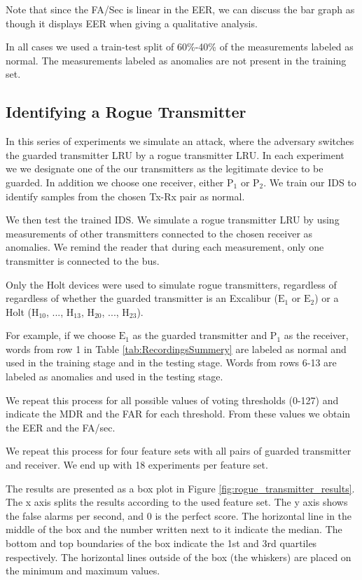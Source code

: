 \documentclass[conference]{IEEEtran}
\begin{document}
  Note that since the FA/Sec is linear in the EER, we can discuss the bar graph as though it displays EER when giving a qualitative analysis.
  
  In all cases we used a train-test split of 60\%-40\% of the measurements labeled as normal. The measurements labeled as anomalies are not present in the training set.
  
\subsection{Identifying a Rogue Transmitter}
  In this series of experiments we simulate an attack, where the adversary switches the guarded transmitter LRU by a rogue transmitter LRU. In each experiment we we designate one of the our transmitters as the legitimate device to be guarded. In addition we choose one receiver, either \(\text{P}_1\) or \(\text{P}_2\).  We train our IDS to identify samples from the chosen Tx-Rx pair as normal.
  
  We then test the trained IDS. We simulate a rogue transmitter LRU by using measurements of other transmitters connected to the chosen receiver as anomalies. We remind the reader that during each measurement, only one transmitter is connected to the bus.
  
  Only the Holt devices were used to simulate rogue transmitters, regardless of regardless of whether the guarded transmitter is an Excalibur (\(\text{E}_1\) or \(\text{E}_2\)) or a Holt (\(\text{H}_{10}\), ..., \(\text{H}_{13}\), \(\text{H}_{20}\), ..., \(\text{H}_{23}\)).
  
  For example, if we choose \(\text{E}_1\) as the guarded transmitter and \(\text{P}_1\) as the receiver, words from row 1 in Table \ref{tab:RecordingsSummery} are labeled as normal and used in the training stage and in the testing stage. Words from rows 6-13 are labeled as anomalies and used in the testing stage.
  
  We repeat this process for all possible values of voting thresholds (0-127) and indicate the MDR and the FAR for each threshold. From these values we obtain the EER and the FA/sec.
  
  We repeat this process for four feature sets with all pairs of guarded transmitter and receiver. We end up with 18 experiments per feature set.
  
  The results are presented as a box plot in Figure \ref{fig:rogue_transmitter_results}. The x axis splits the results according to the used feature set. The y axis shows the false alarms per second, and 0 is the perfect score. The horizontal line in the middle of the box and the number written next to it indicate the median. The bottom and top boundaries of the box indicate the 1st and 3rd quartiles respectively. The horizontal lines outside of the box (the whiskers) are placed on the minimum and maximum values.
  
\end{document}
